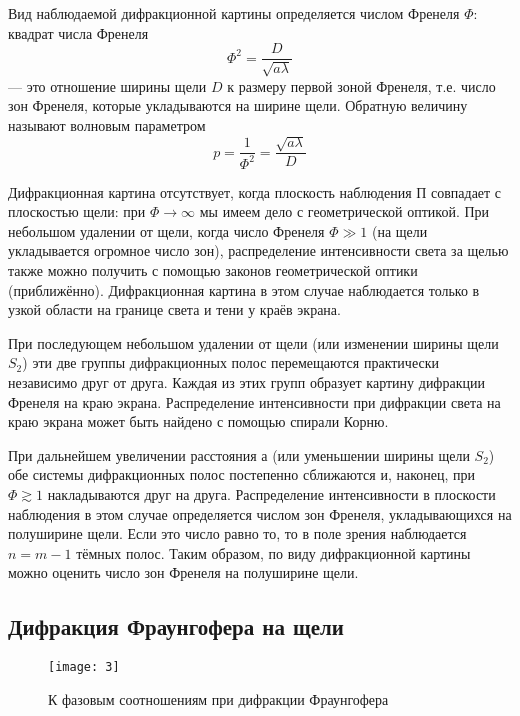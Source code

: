 \documentclass[a4paper, 12pt]{article}
\begin{document}
Вид наблюдаемой дифракционной картины определяется числом Френеля
$\Phi$: квадрат числа Френеля 
\begin{equation}
    \Phi^2 = \frac{D}{\sqrt{a\lambda}}
\end{equation}
--- это отношение ширины щели $D$ к размеру первой зоной Френеля, т.е.
число зон Френеля, которые укладываются на ширине щели. Обратную
величину называют волновым параметром 
\begin{equation}
    p = \frac{1}{\Phi^2} = \frac{\sqrt{a\lambda}}{D}
\end{equation}

Дифракционная картина отсутствует, когда плоскость наблюдения П
совпадает с плоскостью щели: при $\Phi \rightarrow \infty$ мы имеем дело с
геометрической оптикой. При небольшом удалении от щели, когда число
Френеля $\Phi \gg 1$ (на щели укладывается огромное число зон), распределение
интенсивности света за щелью также можно получить с помощью законов
геометрической оптики (приближённо). Дифракционная картина в этом
случае наблюдается только в узкой области на границе света и тени у
краёв экрана.

При последующем небольшом удалении от щели (или изменении ширины щели
$S_2$) эти две группы дифракционных полос перемещаются практически
независимо друг от друга. Каждая из этих групп образует картину
дифракции Френеля на краю экрана. Распределение интенсивности при
дифракции света на краю экрана может быть найдено с помощью спирали
Корню.

При дальнейшем увеличении расстояния а (или уменьшении ширины щели
$S_2$)
обе системы дифракционных полос постепенно сближаются и, наконец, при
$\Phi \gtrsim 1$ накладываются друг на друга. Распределение интенсивности в
плоскости наблюдения в этом случае определяется числом зон Френеля,
укладывающихся на полуширине щели. Если это число равно то, то в поле
зрения наблюдается $n=m-1$ тёмных полос. Таким образом, по виду
дифракционной картины можно оценить число зон Френеля на полуширине
щели.

\subsection*{Дифракция Фраунгофера на щели}

\begin{wrapfigure}[13]{r}{0.3\linewidth}
    \vspace{-10pt}
    \texttt{[image: 3]}
    \caption{К фазовым соотношениям при дифракции Фраунгофера}
\end{wrapfigure}
\end{document}
